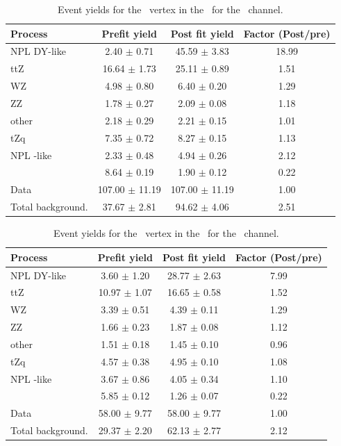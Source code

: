 \begin{table}[htbp]
	\centering
	\caption{Event yields for the \Zut\ vertex in the \TTSR\  for the \mumumu\ channel. }
	\begin{tabular} {l c c c }
		\toprule
		Process & Prefit yield & Post fit yield & Factor (Post/pre) \\
		\midrule
		NPL DY-like & 2.40 $ \pm $ 0.71 & 45.59 $ \pm $ 3.83 & 18.99 \\ 
		ttZ & 16.64 $ \pm $ 1.73 & 25.11 $ \pm $ 0.89 & 1.51 \\ 
		WZ & 4.98 $ \pm $ 0.80 & 6.40 $ \pm $ 0.20 & 1.29 \\ 
		ZZ & 1.78 $ \pm $ 0.27 & 2.09 $ \pm $ 0.08 & 1.18 \\ 
		other & 2.18 $ \pm $ 0.29 & 2.21 $ \pm $ 0.15 & 1.01 \\ 
		tZq & 7.35 $ \pm $ 0.72 & 8.27 $ \pm $ 0.15 & 1.13 \\ 
		NPL \ttbar-like & 2.33 $ \pm $ 0.48 & 4.94 $ \pm $ 0.26 & 2.12\\
		\kZut  & 8.64 $ \pm $ 0.19 & 1.90 $ \pm $ 0.12 & 0.22\\
		\hdashline
		Data & 107.00 $ \pm $ 11.19 & 107.00 $ \pm $ 11.19 & 1.00\\
		Total background. & 37.67 $ \pm $ 2.81 & 94.62 $ \pm $ 4.06 & 2.51\\
		\bottomrule
	\end{tabular}
\end{table}
\begin{table}[htbp]
	\centering
	\caption{Event yields for the \Zut\ vertex in the \TTSR\  for the \emumu\ channel. }
	\begin{tabular} {l c c c }
		\toprule
		Process & Prefit yield & Post fit yield & Factor (Post/pre) \\
		\midrule
		NPL DY-like & 3.60 $ \pm $ 1.20 & 28.77 $ \pm $ 2.63 & 7.99 \\ 
		ttZ & 10.97 $ \pm $ 1.07 & 16.65 $ \pm $ 0.58 & 1.52 \\ 
		WZ & 3.39 $ \pm $ 0.51 & 4.39 $ \pm $ 0.11 & 1.29 \\ 
		ZZ & 1.66 $ \pm $ 0.23 & 1.87 $ \pm $ 0.08 & 1.12 \\ 
		other & 1.51 $ \pm $ 0.18 & 1.45 $ \pm $ 0.10 & 0.96 \\ 
		tZq & 4.57 $ \pm $ 0.38 & 4.95 $ \pm $ 0.10 & 1.08 \\ 
		NPL \ttbar-like & 3.67 $ \pm $ 0.86 & 4.05 $ \pm $ 0.34 & 1.10\\
		\kZut  & 5.85 $ \pm $ 0.12 & 1.26 $ \pm $ 0.07 & 0.22\\
		\hdashline
		Data & 58.00 $ \pm $ 9.77 & 58.00 $ \pm $ 9.77 & 1.00\\
		Total background. & 29.37 $ \pm $ 2.20 & 62.13 $ \pm $ 2.77 & 2.12\\
		\bottomrule
	\end{tabular}
\end{table}
